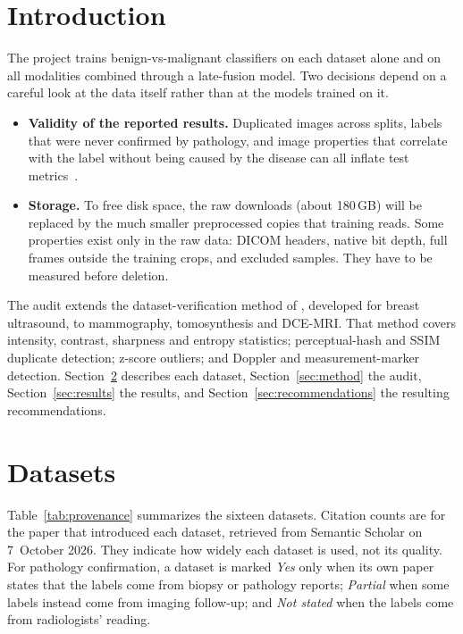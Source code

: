 \documentclass[11pt]{article}
\begin{document}
\section{Introduction}

The project trains benign-vs-malignant classifiers on each dataset alone and on
all modalities combined through a late-fusion model. Two decisions depend on a
careful look at the data itself rather than at the models trained on it.
\begin{itemize}
  \item \textbf{Validity of the reported results.} Duplicated images across
  splits, labels that were never confirmed by pathology, and image properties
  that correlate with the label without being caused by the disease can all
  inflate test metrics~\citep{degrave2021shortcuts}.
  \item \textbf{Storage.} To free disk space, the raw downloads (about 180\,GB)
  will be replaced by the much smaller preprocessed copies that training reads.
  Some properties exist only in the raw data: DICOM headers, native bit depth,
  full frames outside the training crops, and excluded samples. They have to
  be measured before deletion.
\end{itemize}

The audit extends the dataset-verification method of
\citet{siddique2026audit}, developed for breast ultrasound, to mammography,
tomosynthesis and DCE-MRI. That method covers intensity, contrast, sharpness
and entropy statistics; perceptual-hash and SSIM duplicate detection; z-score
outliers; and Doppler and measurement-marker detection.
Section~\ref{sec:datasets} describes each dataset, Section~\ref{sec:method}
the audit, Section~\ref{sec:results} the results, and
Section~\ref{sec:recommendations} the resulting recommendations.

\section{Datasets}
\label{sec:datasets}

Table~\ref{tab:provenance} summarizes the sixteen datasets. Citation counts are
for the paper that introduced each dataset, retrieved from Semantic Scholar on
7~October 2026. They indicate how widely each dataset is used, not its quality.
For pathology confirmation, a dataset is marked \emph{Yes} only when its own
paper states that the labels come from biopsy or pathology reports;
\emph{Partial} when some labels instead come from imaging follow-up;
and \emph{Not stated} when the labels come from radiologists' reading.
\end{document}
